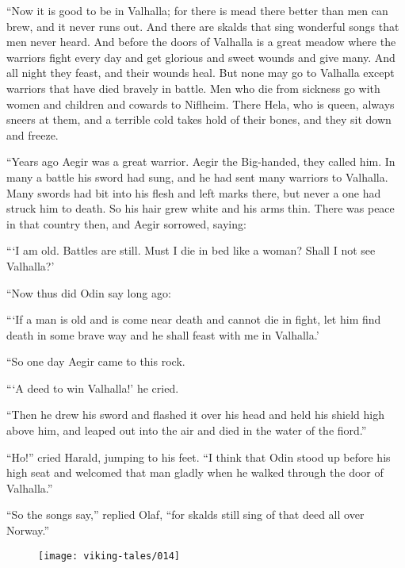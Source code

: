 ``Now it is good to be in Valhalla; for there is mead there better than
men can brew, and it never runs out. And there are skalds that sing
wonderful songs that men never heard. And before the doors of Valhalla
is a great meadow where the warriors fight every day and get glorious
and sweet wounds and give many. And all night they feast, and their
wounds heal. But none may go to Valhalla except warriors that have died
bravely in battle. Men who die from sickness go with women and children
and cowards to Niflheim. There Hela, who is queen, always sneers at
them, and a terrible cold takes hold of their bones, and they sit down
and freeze.

``Years ago Aegir was a great warrior. Aegir the Big-handed, they called
him. In many a battle his sword had sung, and he had sent many warriors
to Valhalla. Many swords had bit into his flesh and left marks there,
but never a one had struck him to death. So his hair grew white and his
arms thin. There was peace in that country then, and Aegir sorrowed,
saying:

```I am old. Battles are still. Must I die in bed like a woman? Shall I
not see Valhalla?'

``Now thus did Odin say long ago:

```If a man is old and is come near death and cannot die in fight, let
him find death in some brave way and he shall feast with me in
Valhalla.'

``So one day Aegir came to this rock.

```A deed to win Valhalla!' he cried.

``Then he drew his sword and flashed it over his head and held his
shield high above him, and leaped out into the air and died in the water
of the fiord.''

``Ho!'' cried Harald, jumping to his feet. ``I think that Odin stood up
before his high seat and welcomed that man gladly when he walked through
the door of Valhalla.''

``So the songs say,'' replied Olaf, ``for skalds still sing of that deed
all over Norway.''

\begin{figure}[hb]
    \centering
    \vskip8pt
    \texttt{[image: viking-tales/014]}
\end{figure}
